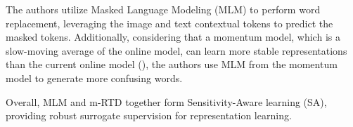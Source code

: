 The authors utilize Masked Language Modeling (MLM) to perform word replacement, leveraging the image and text contextual tokens to predict the masked tokens. Additionally, considering that a momentum model, which is a slow-moving average of the online model, can learn more stable representations than the current online model (\cite{grill2020bootstraplatentnewapproach}), the authors use MLM from the momentum model to generate more confusing words. 

Overall, MLM and m-RTD together form Sensitivity-Aware learning (SA), providing robust surrogate supervision for representation learning.



